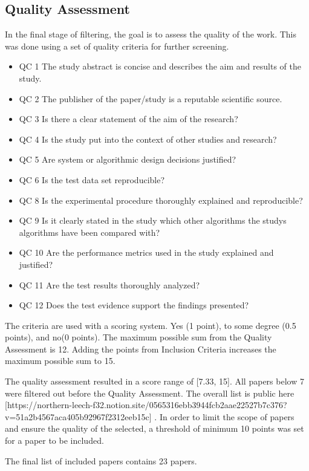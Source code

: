 \subsection{Quality Assessment}
In the final stage of filtering, the goal is to assess the quality of the work.
This was done using a set of quality criteria for further screening.
\begin{itemize}
    \item QC 1	The study abstract is concise and describes the aim and results of the study.
    \item QC 2	The publisher of the paper/study is a reputable scientific source.
    \item QC 3	Is there a clear statement of the aim of the research?
    \item QC 4	Is the study put into the context of other studies and research?
    \item QC 5	Are system or algorithmic design decisions justified?
    \item QC 6	Is the test data set reproducible?
    \item QC 8	Is the experimental procedure thoroughly explained and reproducible?
    \item QC 9	Is it clearly stated in the study which other algorithms the studys algorithms have been compared with?
    \item QC 10	Are the performance metrics used in the study explained and justified?
    \item QC 11	Are the test results thoroughly analyzed?
    \item QC 12 Does the test evidence support the findings presented?
\end{itemize}

The criteria are used with a scoring system.
Yes (1 point), to some degree (0.5 points), and no(0 points).
The maximum possible sum from the Quality Assessment is 12. Adding the points from Inclusion Criteria
increases the maximum possible sum to 15.

The quality assessment resulted in a score range of [7.33, 15]. All papers below 7 were filtered out before
the Quality Assessment.
The overall list is public here [https://northern-leech-f32.notion.site/0565316ebb3944fcb2aae22527b7c376?v=51a2b4567aca405b92967f2312eeb15c]
\cite{SLR-cutoff}.
In order to limit the scope of papers and ensure the quality of the selected, a threshold of minimum 10 points
was set for a paper to be included.

The final list of included papers contains 23 papers.